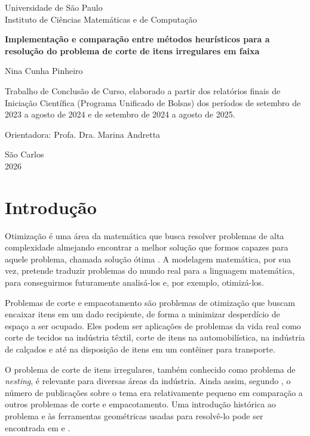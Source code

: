 \documentclass{article}
\begin{document}
\begin{titlepage}
\centering
{\large Universidade de São Paulo\\
Instituto de Ciências Matemáticas e de Computação\par}
\vspace*{\fill}
{\LARGE\bfseries Implementação e comparação entre métodos heurísticos para a resolução do problema de corte de itens irregulares em faixa\par}
\vspace{1.5cm}
{\large Nina Cunha Pinheiro\par}
\vspace*{\fill}
{\small Trabalho de Conclusão de Curso, elaborado a partir dos relatórios finais de Iniciação Científica (Programa Unificado de Bolsas) dos períodos de setembro de 2023 a agosto de 2024 e de setembro de 2024 a agosto de 2025.\par}
\vspace{0.5cm}
{\normalsize Orientadora: Profa. Dra. Marina Andretta\par}
\vspace{1cm}
São Carlos\\2026
\end{titlepage}


\section{Introdução}

Otimização é uma área da matemática que busca resolver problemas de alta complexidade almejando encontrar a melhor solução que formos capazes para aquele problema, chamada solução ótima \cite{arenales}. A modelagem matemática, por sua vez, pretende traduzir problemas do mundo real para a linguagem matemática, para conseguirmos futuramente analisá-los e, por exemplo, otimizá-los.

Problemas de corte e empacotamento são problemas de otimização que buscam encaixar itens em um dado recipiente, de forma a minimizar desperdício de espaço a ser ocupado. Eles podem ser aplicações de problemas da vida real como corte de tecidos na indústria têxtil, corte de itens na automobilística, na indústria de calçados \cite{key} e até na disposição de itens em um contêiner para transporte.

O problema de corte de itens irregulares, também conhecido como problema de {\it nesting}, é relevante para diversas áreas da indústria. Ainda assim, segundo \cite{geometry}, o número de publicações sobre o tema era relativamente pequeno em comparação a outros problemas de corte e empacotamento. Uma introdução histórica ao problema e às ferramentas geométricas usadas para resolvê-lo pode ser encontrada em \cite{irregular} e \cite{geometry}.
\end{document}
